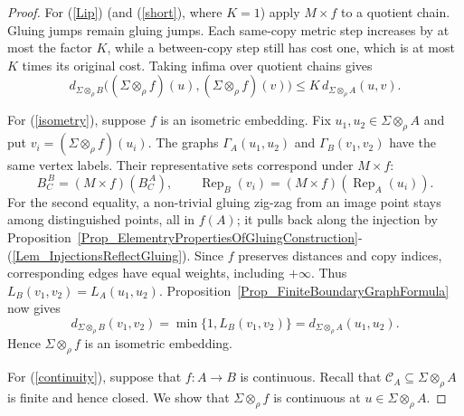 \documentclass{sn-jnl}%
\theoremstyle{thmstyleone}%
\theoremstyle{thmstyletwo}%
\theoremstyle{thmstylethree}%
\newcommand{\M}{\Sigma}
\newcommand{\Fw}{\M\otimes_{\w}}
\newcommand{\w}{\rho}
\begin{document}
\begin{proof}
For \textup{(\ref{Lip})} (and \textup{(\ref{short})}, where $K=1$) apply $M\times f$ to a quotient chain. Gluing jumps remain gluing jumps. Each same-copy metric step increases by at most the factor $K$, while a between-copy step still has cost one, which is at most $K$ times its original cost. Taking infima over quotient chains gives
\begin{equation} 
\nonumber
    d_{\Fw B}\bigl((\Fw f)(u),(\Fw f)(v)\bigr) \leq K\,d_{\Fw A}(u,v).
\end{equation}

For (\ref{isometry}), suppose $f$ is an isometric embedding. Fix $u_1,u_2\in\Fw A$ and put $v_i=(\Fw f)(u_i)$. The graphs $\Gamma_A(u_1,u_2)$ and $\Gamma_B(v_1,v_2)$ have the same vertex labels. Their representative sets correspond under $M\times f$:
\begin{equation} 
\nonumber
    B_C^{\,B}=(M\times f)(B_C^{\,A}),\qquad \operatorname{Rep}_B(v_i)=(M\times f)(\operatorname{Rep}_A(u_i)).
\end{equation}
For the second equality, a non-trivial gluing zig-zag from an image point stays among distinguished points, all in $f(A)$; it pulls back along the injection by Proposition~\ref{Prop_ElementryPropertiesOfGluingConstruction}-(\ref{Lem_InjectionsReflectGluing}). Since $f$ preserves distances and copy indices, corresponding edges have equal weights, including $+\infty$. Thus $L_B(v_1,v_2)=L_A(u_1,u_2)$. Proposition~\ref{Prop_FiniteBoundaryGraphFormula} now gives 
\begin{equation} 
\nonumber
    d_{\Fw B}(v_1,v_2)=\min\{1,L_B(v_1,v_2)\} = d_{\Fw A}(u_1,u_2).
\end{equation}
Hence $\Fw f$ is an isometric embedding.

For (\ref{continuity}), suppose that $f:A\to B$ is continuous. Recall that $\mathcal C_A\subseteq\Fw A$ is finite and hence closed. We show that $\Fw f$ is continuous at $u\in\Fw A$.


\end{proof}
\end{document}
